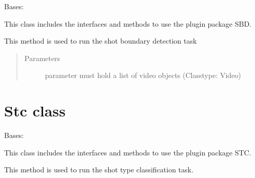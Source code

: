 \documentclass[letterpaper,10pt,english,openany,oneside]{sphinxmanual}
\begin{document}
\begin{fulllineitems}
\label{\detokenize{Sbd:Sbd.Sbd}}
Bases: 

This class includes the interfaces and methods to use the plugin package SBD.

\begin{fulllineitems}
\label{\detokenize{Sbd:Sbd.Sbd.run}}
This method is used to run the shot boundary detection task
\begin{quote}\begin{description}
\item[{Parameters}] \leavevmode
{} \textendash{} parameter must hold a list of video objects (Class\sphinxhyphen{}type: Video)

\end{description}\end{quote}

\end{fulllineitems}


\end{fulllineitems}



\section{Stc class}
\label{\detokenize{Stc:stc-class}}\label{\detokenize{Stc::doc}}

\begin{fulllineitems}
\label{\detokenize{Stc:Stc.Stc}}
Bases: 

This class includes the interfaces and methods to use the plugin package STC.

\begin{fulllineitems}
\label{\detokenize{Stc:Stc.Stc.run}}
This method is used to run the shot type classification task.

\end{fulllineitems}


\end{fulllineitems}
\end{document}
